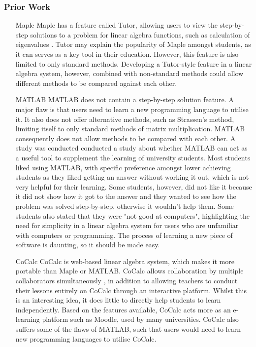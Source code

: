 \begin{frame}[allowframebreaks]
\frametitle{Prior Work}\pause
\begin{itemize}[<+->]
\item[Maple] Maple has a feature called Tutor, allowing users to view the step-by-step solutions to a problem for linear algebra functions, such as calculation of eigenvalues \cite{eigentutor}. Tutor may explain the popularity of Maple amongst students, as it can serves as a key tool in their education. However, this feature is also limited to only standard methods. Developing a Tutor-style feature in a linear algebra system, however, combined with non-standard methods could allow different methods to be compared against each other.\newline

\item[MATLAB] MATLAB does not contain a step-by-step solution feature. A major flaw is that users need to learn a new programming language to utilise it. It also does not offer alternative methods, such as Strassen's method, limiting itself to only standard methods of matrix multiplication. MATLAB consequently does not allow methods to be compared with each other. A study was conducted \cite{matlab} conducted a study about whether MATLAB can act as a useful tool to supplement the learning of university students. Most students liked using MATLAB, with specific preference amongst lower achieving students as they liked getting an answer without working it out, which is not very helpful for their learning. Some students, however, did not like it because it did not show how it got to the answer and they wanted to see how the problem was solved step-by-step, otherwise it wouldn't help them. Some students also stated that they were "not good at computers", highlighting the need for simplicity in a linear algebra system for users who are unfamiliar with computers or programming. The process of learning a new piece of software is daunting, so it should be made easy.

\item[CoCalc] CoCalc \cite{Stein2018a} is web-based linear algebra system, which makes it more portable than Maple or MATLAB. CoCalc allows collaboration by multiple collaborators simultaneously \cite{collab}, in addition to allowing teachers to conduct their lessons entirely on CoCalc through an interactive platform. Whilst this is an interesting idea, it does little to directly help students to learn independently. Based on the features available, CoCalc acts more as an e-learning platform such as Moodle, used by many universities. CoCalc also suffers some of the flaws of MATLAB, such that users would need to learn new programming languages to utilise CoCalc.
\end{itemize}
\end{frame}

